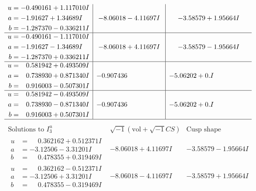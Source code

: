 \documentclass[1p]{elsarticle_modified}
\theoremstyle{definition}
\newcommand{\I}{\sqrt{-1}}
\begin{document}
$$\begin{array}{c|c|c}
\begin{aligned}
u &= -0.490161 + 1.117010 I \\
a &= -1.91627 + 1.34689 I \\
b &= -1.287370 - 0.336211 I\end{aligned}
 & -8.06018 - 4.11697 I & -3.58579 + 1.95664 I \\ \hline\begin{aligned}
u &= -0.490161 - 1.117010 I \\
a &= -1.91627 - 1.34689 I \\
b &= -1.287370 + 0.336211 I\end{aligned}
 & -8.06018 + 4.11697 I & -3.58579 - 1.95664 I \\ \hline\begin{aligned}
u &= \phantom{-}0.581942 + 0.493509 I \\
a &= \phantom{-}0.738930 + 0.871340 I \\
b &= \phantom{-}0.916003 - 0.507301 I\end{aligned}
 & -0.907436\phantom{ +0.000000I} & -5.06202 + 0. I\phantom{ +0.000000I} \\ \hline\begin{aligned}
u &= \phantom{-}0.581942 - 0.493509 I \\
a &= \phantom{-}0.738930 - 0.871340 I \\
b &= \phantom{-}0.916003 + 0.507301 I\end{aligned}
 & -0.907436\phantom{ +0.000000I} & -5.06202 + 0. I\phantom{ +0.000000I}\\
 \hline 
 \end{array}$$\newpage$$\begin{array}{c|c|c}  
\text{Solutions to }I^u_{3}& \I (\text{vol} + \sqrt{-1}CS) & \text{Cusp shape}\\
 \hline 
\begin{aligned}
u &= \phantom{-}0.362162 + 0.512371 I \\
a &= -3.12506 - 3.31201 I \\
b &= \phantom{-}0.478355 + 0.319469 I\end{aligned}
 & -8.06018 + 4.11697 I & -3.58579 - 1.95664 I \\ \hline\begin{aligned}
u &= \phantom{-}0.362162 - 0.512371 I \\
a &= -3.12506 + 3.31201 I \\
b &= \phantom{-}0.478355 - 0.319469 I\end{aligned}
 & -8.06018 - 4.11697 I & -3.58579 + 1.95664 I \\ \hline\begin{aligned}

\end{aligned}
\end{array}$$
\end{document}
